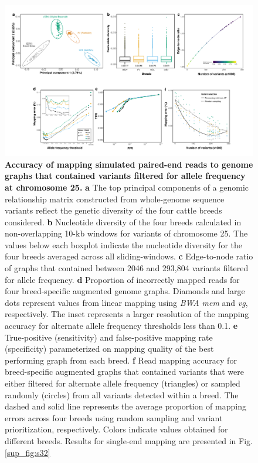 \documentclass[../main.tex]{subfiles}
\begin{document}
\begin{figure}[!htb]
    \centering
    \includegraphics[width=\textwidth]{paper2/main_figure/Fig2.pdf}
    \caption[Affect allele frequency on graph mapping accuracy]{\textbf{Accuracy of mapping simulated paired-end reads to genome graphs that contained variants filtered for allele frequency at chromosome 25.} 
    \small{\textbf{a} The top principal components of a genomic relationship matrix constructed from whole-genome sequence variants reflect the genetic diversity of the four cattle breeds considered. \textbf{b} Nucleotide diversity of the four breeds calculated in non-overlapping 10-kb windows for variants of chromosome 25. The values below each boxplot indicate the nucleotide diversity for the four breeds averaged across all sliding-windows. \textbf{c} Edge-to-node ratio of graphs that contained between 2046 and 293,804 variants filtered for allele frequency. \textbf{d} Proportion of incorrectly mapped reads for four breed-specific augmented genome graphs. Diamonds and large dots represent values from linear mapping using \emph{BWA mem} and \emph{vg}, respectively. The inset represents a larger resolution of the mapping accuracy for alternate allele frequency thresholds less than 0.1. \textbf{e} True-positive (sensitivity) and false-positive mapping rate (specificity) parameterized on mapping quality of the best performing graph from each breed. \textbf{f} Read mapping accuracy for breed-specific augmented graphs that contained variants that were either filtered for alternate allele frequency (triangles) or sampled randomly (circles) from all variants detected within a breed. The dashed and solid line represents the average proportion of mapping errors across four breeds using random sampling and variant prioritization, respectively. Colors indicate values obtained for different breeds. Results for single-end mapping are presented in Fig. \ref{sup_fig:s32}}}
    \label{fig32:freq}
\end{figure}
\end{document}
